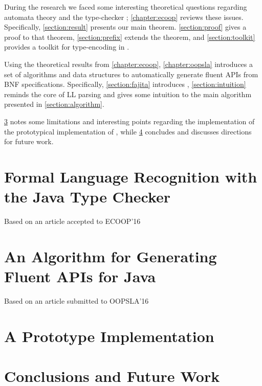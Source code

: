 \documentclass[12pt]{book}
\begin{document}
During the research we faced some interesting theoretical questions regarding
automata theory and the \Java type-checker ; \cref{chapter:ecoop} reviews
these issues. Specifically, \cref{section:result} presents our main theorem.
\cref{section:proof} gives a proof to that theorem, \cref{section:prefix}
extends the theorem, and \cref{section:toolkit} provides a toolkit for type-encoding
in \Java.

Using the theoretical results from \cref{chapter:ecoop}, \cref{chapter:oopsla}
introduces a set of algorithms and data structures to automatically generate
fluent APIs from BNF specifications. Specifically,
\cref{section:fajita} introduces \Fajita, \cref{section:intuition}
reminds the core of LL parsing and gives some intuition to the main algorithm
presented in \cref{section:algorithm}.

\cref{chapter:prototype} notes some limitations and interesting points
regarding the implementation of the prototypical implementation of \Fajita,
while \cref{chapter:conclusions} concludes and discusses directions for future
work.

\chapter{Formal Language Recognition with the Java Type Checker}
\Large Based on an article accepted to ECOOP'16~\cite{Gil:Levy:2016}
\label{chapter:ecoop}
\normalsize


\chapter{An Algorithm for Generating Fluent APIs for Java}
\Large Based on an article submitted to OOPSLA'16~\cite{Gil:Levy:2016a}
\label{chapter:oopsla}
\normalsize


\chapter{A Prototype Implementation}
\label{chapter:prototype}


\chapter{Conclusions and Future Work}
\label{chapter:conclusions}





\end{document}
